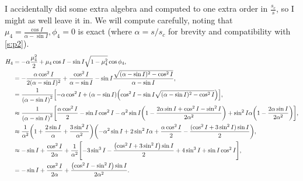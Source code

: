 \documentclass[11pt,
        usenames, %
        dvipsnames %
    ]{article}
\DeclarePairedDelimiter\p{\lparen}{\rparen}
\DeclarePairedDelimiter\s{\lbrack}{\rbrack}
\begin{document}
I accidentally did some extra algebra and computed to one extra order in
$\frac{s_c}{s}$, so I might as well leave it in. We will compute carefully,
noting that $\mu_4 = \frac{\cos I}{\alpha - \sin I}, \phi_4 = 0$ is exact (where
$\alpha = s/s_c$ for brevity and compatibility with \autoref{s:p2}).
\begin{align*}
    H_4 &= -\alpha \frac{\mu_4^2}{2} + \mu_4 \cos I - \sin I \sqrt{1 - \mu_4^2}
            \cos \phi_4,\\
        &= -\frac{\alpha \cos^2 I}{2(\alpha - \sin I)^2}
            + \frac{\cos^2 I}{\alpha - \sin I}
            - \sin I \frac{\sqrt{(\alpha - \sin I)^2 - \cos^2 I}}{
                \alpha - \sin I},\\
        &= \frac{1}{\p*{\alpha - \sin I}^2}
            \s*{-\alpha \cos^2 I + \p*{\alpha - \sin I}
                \p*{\cos^2 I - \sin I \sqrt{
                    (\alpha - \sin I)^2 - \cos^2 I}}},\\
        &\approx \frac{1}{\p*{\alpha - \sin I}^2}
            \s*{\frac{\alpha \cos^2 I}{2} -\sin I \cos^2 I - \alpha^2 \sin I
                \p*{1 - \frac{2\alpha \sin I + \cos^2 I - \sin^2 I}{2\alpha^2}}
                + \sin^2 I\alpha\p*{1 - \frac{2\alpha \sin I}{2\alpha^2}}},\\
        &\approx \frac{1}{\alpha^2}\p*{1 + \frac{2\sin I}{\alpha}
            + \frac{3\sin^2 I}{\alpha^2}}\p*{
                -\alpha^2 \sin I + 2\sin^2 I\alpha
                    + \frac{\alpha \cos^2 I}{2}
                    - \frac{(\cos^2 I + 3\sin^2 I)\sin I}{2}},\\
        &\approx -\sin I + \frac{\cos^2 I}{2\alpha}
            + \frac{1}{\alpha^2}\s*{
                -3\sin^3 I - \frac{\p*{\cos^2 I + 3\sin^2 I}\sin I}{2}
                    + 4\sin^3 I + \sin I \cos^2 I},\\
        &= -\sin I + \frac{\cos^2 I}{2\alpha}
            + \frac{\p*{\cos^2 I - \sin^2 I}\sin I}{2\alpha^2}.
\end{align*}
\end{document}
